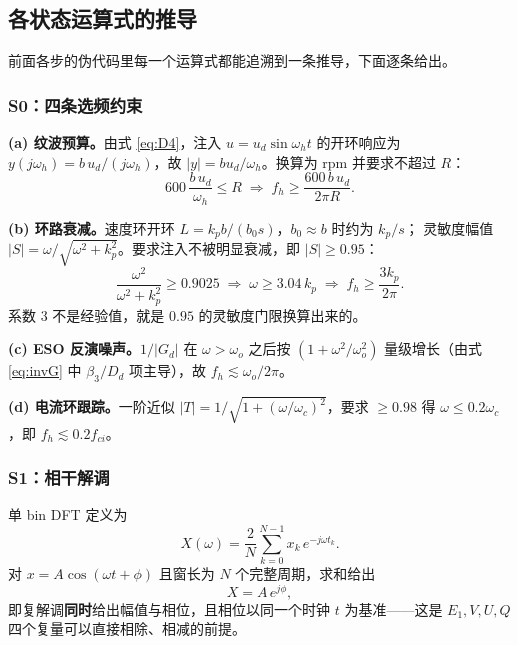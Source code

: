\documentclass[11pt,a4paper]{ctexart}
\begin{document}
\subsection{各状态运算式的推导}

前面各步的伪代码里每一个运算式都能追溯到一条推导，下面逐条给出。

\subsubsection*{S0：四条选频约束}

\textbf{(a) 纹波预算。}由式 \eqref{eq:D4}，注入 $u=u_d\sin\omega_ht$ 的开环响应为
$y(j\omega_h)=b\,u_d/(j\omega_h)$，故 $\lvert y\rvert=b u_d/\omega_h$。换算为 rpm 并要求不超过 $R$：
\begin{equation}
600\,\frac{b\,u_d}{\omega_h}\le R
\;\Longrightarrow\;
f_h\ge\frac{600\,b\,u_d}{2\pi R} .
\label{eq:E1}
\end{equation}

\textbf{(b) 环路衰减。}速度环开环 $L=k_p b/(b_0 s)$，$b_0\approx b$ 时约为 $k_p/s$；
灵敏度幅值 $\lvert S\rvert=\omega/\sqrt{\omega^2+k_p^2}$。要求注入不被明显衰减，即 $\lvert S\rvert\ge0.95$：
\begin{equation}
\frac{\omega^2}{\omega^2+k_p^2}\ge0.9025\;\Longrightarrow\;\omega\ge3.04\,k_p
\;\Longrightarrow\;f_h\ge\frac{3k_p}{2\pi}.
\label{eq:E2}
\end{equation}
系数 $3$ 不是经验值，就是 $0.95$ 的灵敏度门限换算出来的。

\textbf{(c) ESO 反演噪声。}$1/\lvert G_d\rvert$ 在 $\omega>\omega_o$ 之后按
$(1+\omega^2/\omega_o^2)$ 量级增长（由式 \eqref{eq:invG} 中 $\beta_3/D_d$ 项主导），故
$f_h\lesssim\omega_o/2\pi$。

\textbf{(d) 电流环跟踪。}一阶近似 $\lvert T\rvert=1/\sqrt{1+(\omega/\omega_c)^2}$，要求 $\ge0.98$ 得
$\omega\le0.2\omega_c$，即 $f_h\lesssim0.2f_{ci}$。

\subsubsection*{S1：相干解调}

单 bin DFT 定义为
\begin{equation}
X(\omega)=\frac{2}{N}\sum_{k=0}^{N-1}x_k\,e^{-j\omega t_k}.
\label{eq:E3}
\end{equation}
对 $x=A\cos(\omega t+\phi)$ 且窗长为 $N$ 个完整周期，求和给出
\begin{equation}
X=A\,e^{j\phi},
\end{equation}
即复解调\textbf{同时}给出幅值与相位，且相位以同一个时钟 $t$ 为基准——这是
$E_1,V,U,Q$ 四个复量可以直接相除、相减的前提。
\end{document}
